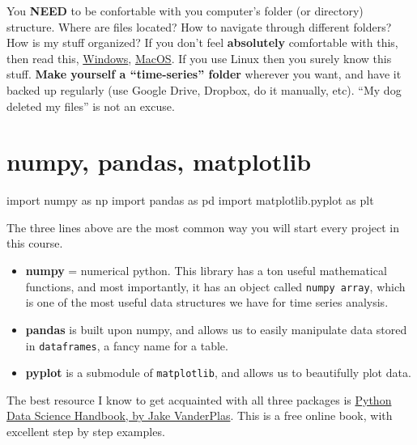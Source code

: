 \documentclass[
  letterpaper,
  DIV=11,
  numbers=noendperiod,
  oneside]{scrreprt}
\newenvironment{Shaded}{\begin{snugshade}}{\end{snugshade}}
\newcommand{\ImportTok}[1]{\textcolor[rgb]{0.00,0.46,0.62}{#1}}
\newcommand{\NormalTok}[1]{\textcolor[rgb]{0.00,0.23,0.31}{#1}}
\providecommand{\tightlist}{%
  \setlength{\itemsep}{0pt}\setlength{\parskip}{0pt}}\usepackage{longtable,booktabs,array}
\begin{document}
You \textbf{NEED} to be confortable with you computer's folder (or
directory) structure. Where are files located? How to navigate through
different folders? How is my stuff organized? If you don't feel
\textbf{absolutely} comfortable with this, then read this,
\href{http://www2.westsussex.gov.uk/LearningandDevelopment/IT\%20Learning\%20Guides/Microsoft\%20Windows\%207/05\%20Working\%20with\%20folders.pdf}{Windows},
\href{https://recoverit.wondershare.com/mac-tips/mac-finder-tutorial-mac.html}{MacOS}.
If you use Linux then you surely know this stuff. \textbf{Make yourself
a ``time-series'' folder} wherever you want, and have it backed up
regularly (use Google Drive, Dropbox, do it manually, etc). ``My dog
deleted my files'' is not an excuse.

\hypertarget{numpy-pandas-matplotlib}{%
\chapter{numpy, pandas, matplotlib}\label{numpy-pandas-matplotlib}}

\begin{Shaded}
\begin{Highlighting}[]
\ImportTok{import}\NormalTok{ numpy }\ImportTok{as}\NormalTok{ np}
\ImportTok{import}\NormalTok{ pandas }\ImportTok{as}\NormalTok{ pd}
\ImportTok{import}\NormalTok{ matplotlib.pyplot }\ImportTok{as}\NormalTok{ plt}
\end{Highlighting}
\end{Shaded}

The three lines above are the most common way you will start every
project in this course.

\begin{itemize}
\tightlist
\item
  \textbf{numpy} = numerical python. This library has a ton useful
  mathematical functions, and most importantly, it has an object called
  \texttt{numpy\ array}, which is one of the most useful data structures
  we have for time series analysis.
\item
  \textbf{pandas} is built upon numpy, and allows us to easily
  manipulate data stored in \texttt{dataframes}, a fancy name for a
  table.
\item
  \textbf{pyplot} is a submodule of \texttt{matplotlib}, and allows us
  to beautifully plot data.
\end{itemize}

The best resource I know to get acquainted with all three packages is
\href{https://jakevdp.github.io/PythonDataScienceHandbook/index.html}{Python
Data Science Handbook, by Jake VanderPlas}. This is a free online book,
with excellent step by step examples.
\end{document}
